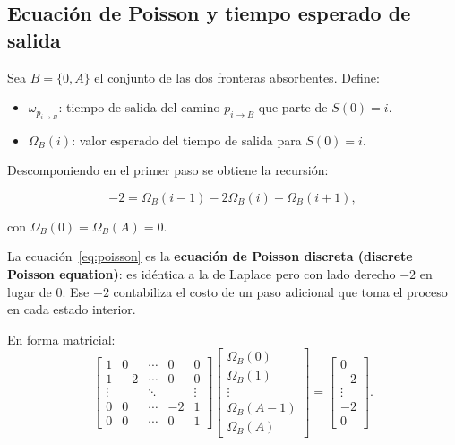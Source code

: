 \documentclass[12pt]{article}
\begin{document}
\subsection{Ecuaci\'on de Poisson y tiempo esperado de salida}

Sea $B = \{0, A\}$ el conjunto de las dos fronteras absorbentes.
Define:
\begin{itemize}
  \item $\omega_{p_{i \to B}}$: tiempo de salida del camino $p_{i \to B}$ que parte de $S(0) = i$.
  \item $\Omega_B(i)$: valor esperado del tiempo de salida para $S(0) = i$.
\end{itemize}

Descomponiendo en el primer paso se obtiene la recursi\'on:

\begin{equation}
  -2 = \Omega_B(i-1) - 2\Omega_B(i) + \Omega_B(i+1),
  \label{eq:poisson}
\end{equation}

con $\Omega_B(0) = \Omega_B(A) = 0$.

\begin{intuicionmat}
La ecuaci\'on~\eqref{eq:poisson} es la \textbf{ecuaci\'on de Poisson discreta
(discrete Poisson equation)}: es id\'entica a la de Laplace pero con lado derecho
$-2$ en lugar de $0$. Ese $-2$ contabiliza el costo de un paso adicional
que toma el proceso en cada estado interior.
\end{intuicionmat}

En forma matricial:
\begin{equation}
  \begin{bmatrix}
    1 & 0 & \cdots & 0 & 0 \\
    1 & -2 & \cdots & 0 & 0 \\
    \vdots & & \ddots & & \vdots \\
    0 & 0 & \cdots & -2 & 1 \\
    0 & 0 & \cdots & 0 & 1
  \end{bmatrix}
  \begin{bmatrix} \Omega_B(0) \\ \Omega_B(1) \\ \vdots \\ \Omega_B(A-1) \\ \Omega_B(A) \end{bmatrix}
  =
  \begin{bmatrix} 0 \\ -2 \\ \vdots \\ -2 \\ 0 \end{bmatrix}.
  \label{eq:poissonmat}
\end{equation}
\end{document}
